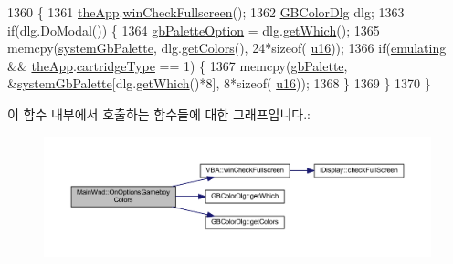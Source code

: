 \begin{DoxyCode}
1360 \{
1361   \mbox{\hyperlink{_v_b_a_8cpp_a8095a9d06b37a7efe3723f3218ad8fb3}{theApp}}.\mbox{\hyperlink{class_v_b_a_a340eaeeb7fcfc242f08ac3442d991a96}{winCheckFullscreen}}();
1362   \mbox{\hyperlink{class_g_b_color_dlg}{GBColorDlg}} dlg;
1363   \textcolor{keywordflow}{if}(dlg.DoModal()) \{
1364     \mbox{\hyperlink{gb_globals_8cpp_ad7c4a50738533f076243c2814ffb61b4}{gbPaletteOption}} = dlg.\mbox{\hyperlink{class_g_b_color_dlg_a8f4e8dbf15d1f2d1bab9df384ebf484e}{getWhich}}();
1365     memcpy(\mbox{\hyperlink{system_8cpp_a0ba4f8654ea47591cc8a66df33d6d3c9}{systemGbPalette}}, dlg.\mbox{\hyperlink{class_g_b_color_dlg_ab3fe3dff45003cb0483ad90eb42a3052}{getColors}}(), 24*\textcolor{keyword}{sizeof}(
      \mbox{\hyperlink{_system_8h_a9e6c91d77e24643b888dbd1a1a590054}{u16}}));
1366     \textcolor{keywordflow}{if}(\mbox{\hyperlink{_main_wnd_options_8cpp_af9cc36078b1b311753963297ae7f2a74}{emulating}} && \mbox{\hyperlink{_v_b_a_8cpp_a8095a9d06b37a7efe3723f3218ad8fb3}{theApp}}.\mbox{\hyperlink{class_v_b_a_af300759fcbc7eeb00ce73f956fc5ddb7}{cartridgeType}} == 1) \{
1367       memcpy(\mbox{\hyperlink{gb_globals_8cpp_a7c46bfb4d71e64d27d5aec543ba85b9a}{gbPalette}}, &\mbox{\hyperlink{system_8cpp_a0ba4f8654ea47591cc8a66df33d6d3c9}{systemGbPalette}}[dlg.\mbox{\hyperlink{class_g_b_color_dlg_a8f4e8dbf15d1f2d1bab9df384ebf484e}{getWhich}}()*8], 8*\textcolor{keyword}{sizeof}(
      \mbox{\hyperlink{_system_8h_a9e6c91d77e24643b888dbd1a1a590054}{u16}}));
1368     \}
1369   \}
1370 \}
\end{DoxyCode}
이 함수 내부에서 호출하는 함수들에 대한 그래프입니다.\+:
\nopagebreak
\begin{figure}[H]
\begin{center}
\leavevmode
\includegraphics[width=350pt]{class_main_wnd_a26f32c1e841c679d112a15f00db1d9b2_cgraph}
\end{center}
\end{figure}
\mbox{\label{class_main_wnd_a50303dd10fbc876ddb67642295664d50}} 

